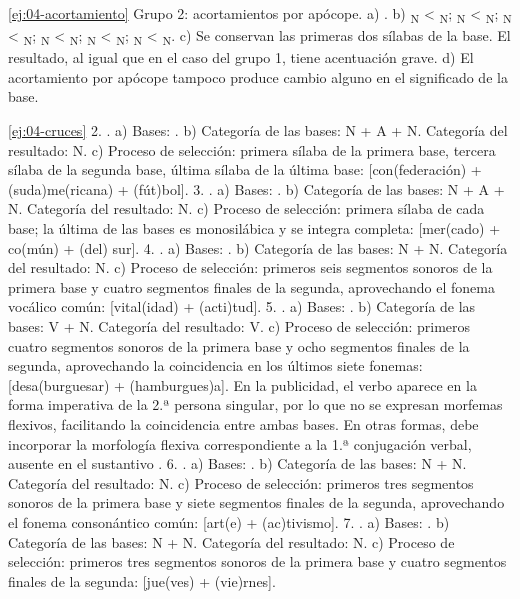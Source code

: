 \begin{solucion}{\ref{ej:04-acortamiento}}
Grupo 2: acortamientos por apócope. a) . b) \textsubscript{N} < \textsubscript{N};
\textsubscript{N} < \textsubscript{N};
\textsubscript{N} < \textsubscript{N};
\textsubscript{N} < \textsubscript{N};
\textsubscript{N} < \textsubscript{N};
\textsubscript{N} < \textsubscript{N}. c) Se
conservan las primeras dos sílabas de la base. El resultado, al igual que en el
caso del grupo 1, tiene acentuación grave. d) El acortamiento por apócope
tampoco produce cambio alguno en el significado de la base.
\end{solucion}

\begin{solucion}{\ref{ej:04-cruces}}
2. . a) Bases: . b) Categoría de las bases: N + A + N. Categoría del resultado: N. c)
Proceso de selección: primera sílaba de la primera base, tercera sílaba de la
segunda base, última sílaba de la última base: [con(federación) +
(suda)me(ricana) + (fút)bol]. 3. . a) Bases: . b) Categoría de las bases: N + A + N. Categoría del
resultado: N. c) Proceso de selección: primera sílaba de cada base; la última de
las bases es monosilábica y se integra completa: [mer(cado) + co(mún) + (del)
sur]. 4. . a) Bases: . b) Categoría
de las bases: N + N. Categoría del resultado: N. c) Proceso de selección:
primeros seis segmentos sonoros de la primera base y cuatro segmentos finales de
la segunda, aprovechando el fonema vocálico común: [vital(idad) + (acti)tud]. 5.
. a) Bases: . b)
Categoría de las bases: V + N. Categoría del resultado: V. c) Proceso de
selección: primeros cuatro segmentos sonoros de la primera base y ocho segmentos
finales de la segunda, aprovechando la coincidencia en los últimos siete
fonemas: [desa(burguesar) + (hamburgues)a]. En la publicidad, el verbo
 aparece en la forma imperativa de la 2.ª persona
singular, por lo que no se expresan morfemas flexivos, facilitando la
coincidencia entre ambas bases. En otras formas,  debe
incorporar la morfología flexiva correspondiente a la 1.ª conjugación verbal,
ausente en el sustantivo . 6. . a) Bases:
. b) Categoría de las bases: N + N. Categoría del
resultado: N. c) Proceso de selección: primeros tres segmentos sonoros de la
primera base y siete segmentos finales de la segunda, aprovechando el fonema
consonántico común: [art(e) + (ac)tivismo]. 7. . a) Bases:
. b) Categoría de las bases: N + N. Categoría del
resultado: N. c) Proceso de selección: primeros tres segmentos sonoros de la
primera base y cuatro segmentos finales de la segunda: [jue(ves) + (vie)rnes].
\end{solucion}

